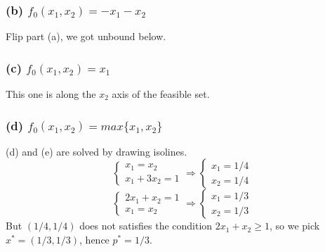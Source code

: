 \documentclass{article}
\begin{document}
    \subsubsection*{(b) $ f_0(x_1, x_2) = -x_1 - x_2$}      
 Flip part (a), we got unbound below.
  \subsubsection*{(c) $ f_0(x_1, x_2) = x_1 $}      
This one is along the $x_2$ axis of the feasible set. 
  \subsubsection*{(d) $ f_0(x_1, x_2) = max \{x_1, x_2\}$}      
  (d) and (e) are solved by drawing isolines.
   \[ \begin{cases}
             x_1= x_2 \\
            x_1 + 3x_2 = 1
        \end{cases} \Rightarrow
        \begin{cases}
            x_1 = 1/4 \\
           x_2 = 1/4
        \end{cases}  \]
          \[ \begin{cases}
            2x_1 + x_2 = 1 \\
             x_1 = x_2 
        \end{cases} \Rightarrow
        \begin{cases}
            x_1 = 1/3 \\
           x_2 = 1/3
        \end{cases}  \]
        But $(1/4, 1/4)$ does not satisfies the condition $2x_1 + x_2 \ge 1$, so we pick $x^* = (1/3, 1/3)$, hence $p^* =  1/3$.
\end{document}
